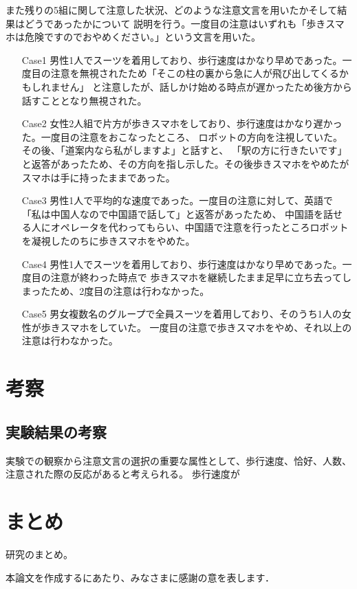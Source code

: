 \documentclass{kuisthesis}
\begin{document}
また残りの5組に関して注意した状況、どのような注意文言を用いたかそして結果はどうであったかについて
説明を行う。一度目の注意はいずれも「歩きスマホは危険ですのでおやめください。」という文言を用いた。
\begin{enumerate}
  \item[Case1] 男性1人でスーツを着用しており、歩行速度はかなり早めであった。一度目の注意を無視されたため「そこの柱の裏から急に人が飛び出してくるかもしれません」
  と注意したが、話しかけ始める時点が遅かったため後方から話すこととなり無視された。
  \item[Case2] 女性2人組で片方が歩きスマホをしており、歩行速度はかなり遅かった。一度目の注意をおこなったところ、
  ロボットの方向を注視していた。その後、「道案内なら私がしますよ」と話すと、
  「駅の方に行きたいです」と返答があったため、その方向を指し示した。その後歩きスマホをやめたがスマホは手に持ったままであった。
  \item[Case3] 男性1人で平均的な速度であった。一度目の注意に対して、英語で「私は中国人なので中国語で話して」と返答があったため、
  中国語を話せる人にオペレータを代わってもらい、中国語で注意を行ったところロボットを凝視したのちに歩きスマホをやめた。
  \item[Case4] 男性1人でスーツを着用しており、歩行速度はかなり早めであった。一度目の注意が終わった時点で
  歩きスマホを継続したまま足早に立ち去ってしまったため、2度目の注意は行わなかった。
  \item[Case5] 男女複数名のグループで全員スーツを着用しており、そのうち1人の女性が歩きスマホをしていた。
  一度目の注意で歩きスマホをやめ、それ以上の注意は行わなかった。
\end{enumerate}

\section{考察}
\subsection{実験結果の考察}
実験での観察から注意文言の選択の重要な属性として、歩行速度、恰好、人数、注意された際の反応があると考えられる。
歩行速度が

\section{まとめ}
研究のまとめ。

本論文を作成するにあたり、みなさまに感謝の意を表します．


\end{document}
